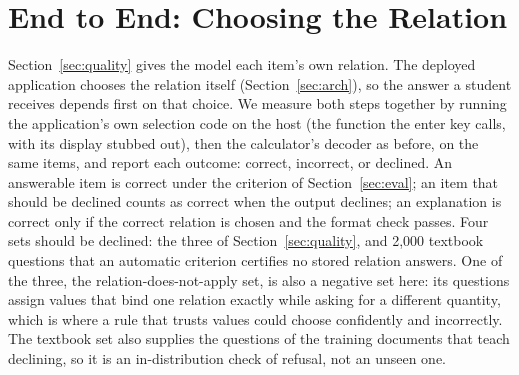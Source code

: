 \documentclass[10pt]{article}
\begin{document}
\section{End to End: Choosing the Relation}
\label{sec:e2e}

Section~\ref{sec:quality} gives the model each item's own relation. The deployed application chooses
the relation itself (Section~\ref{sec:arch}), so the answer a student receives depends first on
that choice. We measure both steps together by running the application's own selection code on the host
(the function the enter key calls, with its display stubbed out), then the calculator's decoder as
before, on the same items, and report each outcome: correct, incorrect, or declined. An answerable item
is correct under the criterion of Section~\ref{sec:eval}; an item that should be declined counts as correct when
the output declines; an explanation is correct only if the correct relation is chosen and the format check
passes. Four sets should be declined: the three of Section~\ref{sec:quality}, and 2,000 textbook questions
that an automatic criterion certifies no stored relation answers. One of the three, the
relation-does-not-apply set, is also a negative set here: its questions assign values that bind one relation
exactly while asking for a different quantity, which is where a rule that trusts values could choose
confidently and incorrectly. The textbook set also supplies the questions of the training documents that
teach declining, so it is an in-distribution check of refusal, not an unseen one.
\end{document}
